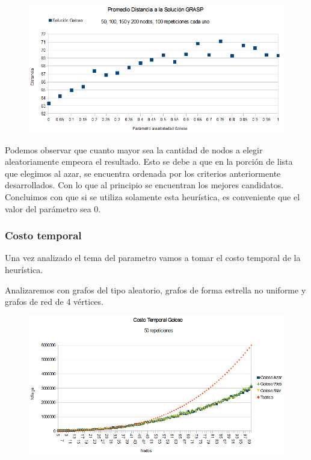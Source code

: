 \begin{figure}[H]
	\centering
	\includegraphics[scale=0.6]{optimizacionGoloso.png}
\end{figure}

\quad Podemos observar que cuanto mayor sea la cantidad de nodos a elegir aleatoriamente empeora el resultado. Esto se debe a que en la porción de lista que elegimos al azar, se encuentra ordenada por los criterios anteriormente desarrollados. Con lo que al principio se encuentran los mejores candidatos. Concluimos con que si se utiliza solamente esta heurística, es conveniente que el valor del parámetro sea 0.

\subsubsection{Costo temporal}

\quad Una vez analizado el tema del parametro vamos a tomar el costo temporal de la heurística.

\quad Analizaremos con grafos del tipo aleatorio, grafos de forma estrella no uniforme y grafos de red de 4 vértices.

\begin{figure}[H]
	\centering
	\includegraphics[scale=0.6]{timingGoloso.png}
\end{figure}

